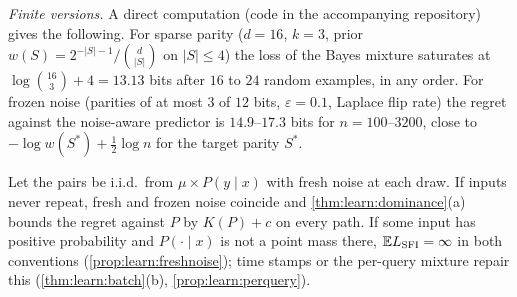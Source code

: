 \emph{Finite versions.} A direct computation (code in the accompanying repository) gives the following. For sparse parity ($d=16$, $k=3$, prior $w(S)=2^{-|S|-1}/\binom d{|S|}$ on $|S|\le4$) the loss of the Bayes mixture saturates at $\log\binom{16}3+4=13.13$ bits after $16$ to $24$ random examples, in any order. For frozen noise (parities of at most $3$ of $12$ bits, $\varepsilon=0.1$, Laplace flip rate) the regret against the noise-aware predictor is $14.9$--$17.3$ bits for $n=100$--$3200$, close to $-\log w(S^*)+\frac12\log n$ for the target parity $S^*$.

\begin{remark}\label{rem:ex:fresh}
Let the pairs be i.i.d.\ from $\mu\times P(y\mid x)$ with fresh noise at each draw. If inputs never repeat, fresh and frozen noise coincide and \cref{thm:learn:dominance}(a) bounds the regret against $P$ by $K(P)+c$ on every path. If some input has positive probability and $P(\cdot\mid x)$ is not a point mass there, $\mathbb{E}L_{\mathrm{SFI}}=\infty$ in both conventions (\cref{prop:learn:freshnoise}); time stamps or the per-query mixture repair this (\cref{thm:learn:batch}(b), \cref{prop:learn:perquery}).
\end{remark}

